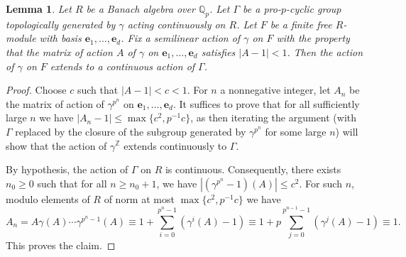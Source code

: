 \documentclass[12pt]{amsart}
\newtheorem{lemma}[theorem]{Lemma}
\theoremstyle{definition}
\numberwithin{equation}{theorem}
\newcommand{\be}{\mathbf{e}}
\newcommand{\QQ}{\mathbb{Q}}
\newcommand{\ZZ}{\mathbb{Z}}
\begin{document}
\begin{lemma} \label{L:lift topological action}
Let $R$ be a Banach algebra over $\QQ_p$. Let $\Gamma$ be a pro-$p$-cyclic group topologically generated by $\gamma$ acting continuously on $R$. Let $F$ be a finite free $R$-module with basis $\be_1,\dots,\be_d$. Fix a semilinear action of $\gamma$ on $F$ with the property that the matrix of action $A$ of $\gamma$ on $\be_1,\dots,\be_d$ satisfies $\left| A-1 \right| < 1$.
Then the action of $\gamma$ on $F$ extends to a continuous action of $\Gamma$.
\end{lemma}
\begin{proof}
Choose $c$ such that $\left| A-1 \right| < c < 1$.
For $n$ a nonnegative integer, let $A_n$ be the matrix of action of $\gamma^{p^n}$
on $\be_1,\dots,\be_d$. It suffices to prove that for all sufficiently large $n$ we have
$\left| A_n-1 \right| \leq \max\{c^2, p^{-1}c\}$, as then iterating the argument (with $\Gamma$ replaced by the closure of the subgroup generated by $\gamma^{p^n}$ for some large $n$) will show that the action of $\gamma^{\ZZ}$ extends continuously to $\Gamma$.

By hypothesis, the action of $\Gamma$ on $R$ is continuous. Consequently, there exists 
$n_0 \geq 0$ such that for all $n \geq n_0+1$, we have $\left| (\gamma^{p^n}-1)(A) \right| \leq c^2$. For such $n$, modulo elements of $R$ of norm at most $\max\{c^2,p^{-1}c\}$ we have
\[
A_{n} = A \gamma(A) \cdots \gamma^{p^{n}-1}(A) \equiv 1 + \sum_{i=0}^{p^{n}-1} (\gamma^i(A)-1) \equiv 1 + p\sum_{j=0}^{p^{n-1}-1} (\gamma^{j}(A)-1) \equiv 1.
\]
This proves the claim.
\end{proof}
\end{document}
